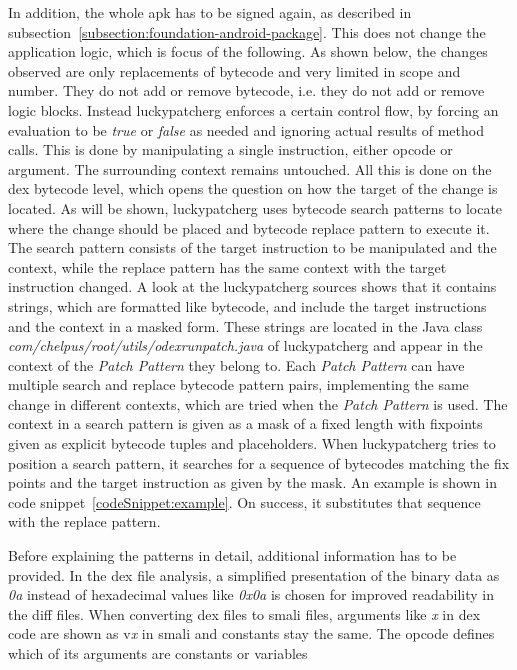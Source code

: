 In addition, the whole \gls{apk} has to be signed again, as described in subsection~\ref{subsection:foundation-android-package}.
This does not change the application logic, which is focus of the following.
\newline
\newline
As shown below, the changes observed are only replacements of bytecode and very limited in scope and number.
They do not add or remove bytecode, i.e. they do not add or remove logic blocks.
Instead \gls{luckypatcherg} enforces a certain control flow, by forcing an evaluation to be \textit{true} or \textit{false} as needed and ignoring actual results of method calls.
This is done by manipulating a single instruction, either opcode or argument.
The surrounding context remains untouched.
\newline
All this is done on the dex bytecode level, which opens the question on how the target of the change is located.
As will be shown, \gls{luckypatcherg} uses bytecode search patterns to locate where the change should be placed and bytecode replace pattern to execute it.
The search pattern consists of the target instruction to be manipulated and the context, while the replace pattern has the same context with the target instruction changed.
\newline
A look at the \gls{luckypatcherg} sources shows that it contains strings, which are formatted like bytecode, and include the target instructions and the context in a masked form.
These strings are located in the Java class \textit{com/chelpus/root/utils/odexrunpatch.java} of \gls{luckypatcherg} and appear in the context of the \textit{Patch Pattern} they belong to.
Each \textit{Patch Pattern} can have multiple search and replace bytecode pattern pairs, implementing the same change in different contexts, which are tried when the \textit{Patch Pattern} is used.
\newline
The context in a search pattern is given as a mask of a fixed length with fixpoints given as explicit bytecode tuples and placeholders.
When \gls{luckypatcherg} tries to position a search pattern, it searches for a sequence of bytecodes matching the fix points and the target instruction as given by the mask.
An example is shown in code snippet~\ref{codeSnippet:example}.
On success, it substitutes that sequence with the replace pattern.
\newline

Before explaining the patterns in detail, additional information has to be provided.
In the \gls{dex} file analysis, a simplified presentation of the binary data as \textit{0a} instead of hexadecimal values like \textit{0x0a} is chosen for improved readability in the diff files.
When converting \gls{dex} files to smali files, arguments like \textit{x} in dex code are shown as  v\textit{x} in smali and constants stay the same.
The opcode defines which of its arguments are constants or variables
